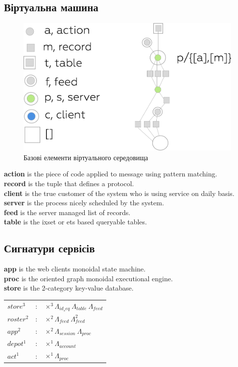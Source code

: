 \documentclass[11pt,oneside]{article}
\begin{document}
\newpage

\subsection{Віртуальна машина}

\begin{figure}[h!]
\centering
\includegraphics[scale=0.3]{img/exe-legend}
\caption{Базові елементи віртуального середовища}
\end{figure}

{\bf action} is the piece of code applied to message using pattern matching.\\
{\bf record} is the tuple that defines a protocol.\\
{\bf client} is the true customer of the system who is using service on daily basis.\\
{\bf server} is the process nicely scheduled by the system.\\
{\bf feed} is the server managed list of records.\\
{\bf table} is the ixset or ets based queryable tables.\\

\subsection{Сигнатури сервісів}

{\bf app} is the web clients monoidal state machine.\\
{\bf proc} is the oriented graph monoidal executional engine.\\
{\bf store} is the 2-category key-value database.\\

\begin{center}
\begin{tabular}{lll}
           $store^3$ &:& $\times^3 \Lambda_{id_seq}\ \Lambda_{table}\ \Lambda_{feed}$ \\
          $roster^2$ &:& $\times^2 \Lambda_{feed}\ \Lambda^2_{feed}$ \\
             $app^2$ &:& $\times^2 \Lambda_{session}\ \Lambda_{proc}$ \\
           $depot^1$ &:& $\times^1 \Lambda_{account}$ \\
             $act^1$ &:& $\times^1 \Lambda_{proc}$ \\
\end{tabular}
\end{center}
\end{document}
